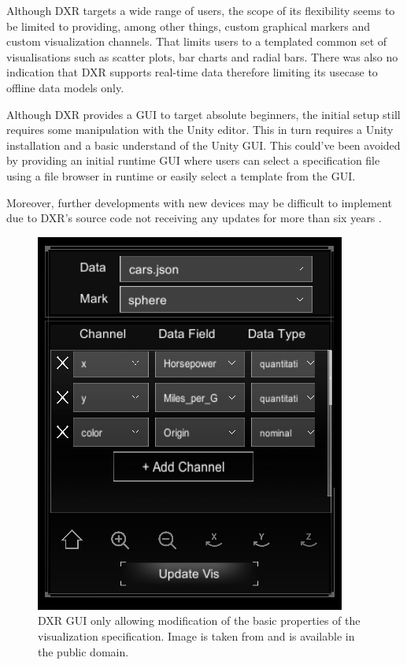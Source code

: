\documentclass{vgtc}                          %
\begin{document}
\medskip

\noindent Although DXR targets a wide range of users, the scope of its flexibility seems to be limited to
providing, among other things, custom graphical markers and custom visualization channels. That limits users
to a templated common set of visualisations such as scatter plots, bar charts and radial bars. There was also
no indication that DXR supports real-time data therefore limiting its usecase to offline data models only.

\noindent Although DXR provides a GUI to target absolute beginners, the initial setup still requires some
manipulation with the Unity editor. This in turn requires a Unity installation and a basic understand of the
Unity GUI. This could've been avoided by providing an initial runtime GUI where users can select a
specification file using a file browser in runtime or easily select a template from the GUI.

\noindent Moreover, further developments with new devices may be difficult to implement due to DXR's source
code not receiving any updates for more than six years \cite{dxr:repo}.

\begin{figure}[t!]
	\centering
	\includegraphics[width=\columnwidth]{dxr_gui}
    \caption{DXR GUI only allowing modification of the basic properties of the visualization specification.
    Image is taken from \cite{dxr:repo} and is available in the public domain.}
    \label{fig:dxr_gui}
\end{figure}
\end{document}
